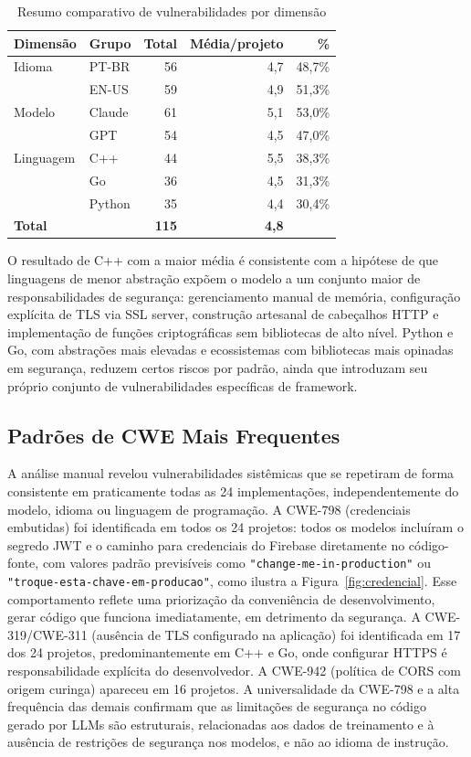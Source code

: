 \documentclass[12pt]{article}
\begin{document}
\begin{table}[ht]
\centering
\caption{Resumo comparativo de vulnerabilidades por dimensão}
\label{tab:resumo}
\begin{tabular}{llrrr}
\hline
\textbf{Dimensão} & \textbf{Grupo} & \textbf{Total} & \textbf{Média/projeto} & \textbf{\%} \\
\hline
Idioma  & PT-BR    & 56 & 4,7 & 48,7\% \\
        & EN-US    & 59 & 4,9 & 51,3\% \\
\hline
Modelo  & Claude   & 61 & 5,1 & 53,0\% \\
        & GPT      & 54 & 4,5 & 47,0\% \\
\hline
Linguagem & C++    & 44 & 5,5 & 38,3\% \\
          & Go     & 36 & 4,5 & 31,3\% \\
          & Python & 35 & 4,4 & 30,4\% \\
\hline
\textbf{Total} & & \textbf{115} & \textbf{4,8} & \\
\hline
\end{tabular}
\end{table}

O resultado de C++ com a maior média é consistente com a hipótese de que linguagens de menor abstração expõem o modelo a um conjunto maior de responsabilidades de segurança: gerenciamento manual de memória, configuração explícita de TLS via SSL server, construção artesanal de cabeçalhos HTTP e implementação de funções criptográficas sem bibliotecas de alto nível. Python e Go, com abstrações mais elevadas e ecossistemas com bibliotecas mais opinadas em segurança, reduzem certos riscos por padrão, ainda que introduzam seu próprio conjunto de vulnerabilidades específicas de framework.

\subsection{Padrões de CWE Mais Frequentes}

A análise manual revelou vulnerabilidades sistêmicas que se repetiram de forma consistente em praticamente todas as 24 implementações, independentemente do modelo, idioma ou linguagem de programação. A CWE-798 (credenciais embutidas) foi identificada em todos os 24 projetos: todos os modelos incluíram o segredo JWT e o caminho para credenciais do Firebase diretamente no código-fonte, com valores padrão previsíveis como \texttt{"change-me-in-production"} ou \texttt{"troque-esta-chave-em-producao"}, como ilustra a Figura~\ref{fig:credencial}. Esse comportamento reflete uma priorização da conveniência de desenvolvimento, gerar código que funciona imediatamente, em detrimento da segurança. A CWE-319/CWE-311 (ausência de TLS configurado na aplicação) foi identificada em 17 dos 24 projetos, predominantemente em C++ e Go, onde configurar HTTPS é responsabilidade explícita do desenvolvedor. A CWE-942 (política de CORS com origem curinga) apareceu em 16 projetos. A universalidade da CWE-798 e a alta frequência das demais confirmam que as limitações de segurança no código gerado por LLMs são estruturais, relacionadas aos dados de treinamento e à ausência de restrições de segurança nos modelos, e não ao idioma de instrução.
\end{document}
